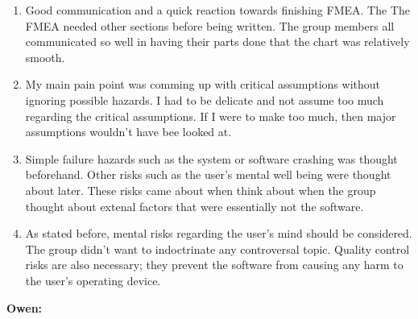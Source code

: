 \documentclass{article}
\begin{document}
\begin{enumerate}
	\item Good communication and a quick reaction towards finishing FMEA. The The FMEA needed other sections before being written. The group members all communicated so well in having their parts done that the chart was relatively smooth. 
	\item My main pain point was comming up with critical assumptions without ignoring possible hazards. I had to be delicate and not assume too much regarding the critical assumptions. If I were to make too much, then major assumptions wouldn't have bee looked at. 
	\item Simple failure hazards such as the system or software crashing was thought beforehand. Other risks such as the user's mental well being were thought about later. These risks came about when think about when the group thought about extenal factors that were essentially not the software.   
	\item As stated before, mental risks regarding the user's mind should be considered. The group didn't want to indoctrinate any controversal topic. Quality control risks are also necessary; they prevent the software from causing any harm to the user's operating device.  
\end{enumerate}

\textbf{Owen:}
\end{document}
